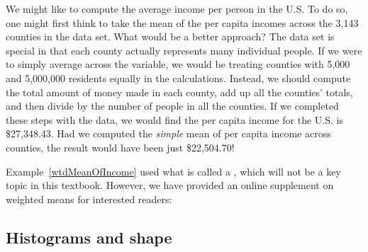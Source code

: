 \begin{example}{We might like to compute the average income per person in the U.S. To do so, one might first think to take the mean of the per capita incomes across the 3,143 counties in the  data set. What would be a better approach?} \label{wtdMeanOfIncome}
The  data set is special in that each county actually represents many individual people. If we were to simply average across the  variable, we would be treating counties with 5,000 and 5,000,000 residents equally in the calculations. Instead, we should compute the total amount of money made in each county, add up all the counties' totals, and then divide by the number of people in all the counties. %
If we completed these steps with the  data, we would find the per capita income for the U.S. is \$27,348.43. Had we computed the \emph{simple} mean of per capita income across counties, the result would have been just \$22,504.70!
\end{example}

Example~\ref{wtdMeanOfIncome} used what is called a , which will not be a key topic in this textbook. However, we have provided an online supplement on weighted means for interested readers:
\begin{center}
\end{center}

\subsection{Histograms and shape}
\label{histogramsAndShape}

